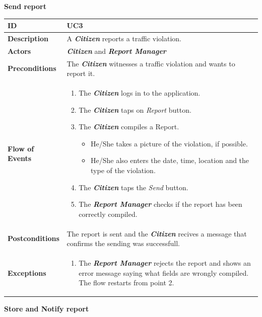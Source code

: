 \documentclass{report}
\begin{document}
\begin{center}
	\textbf{Send report}
\end{center}

\begin{tabularx}{\linewidth}{| l | X |}
	\hline
	\textbf{ID} & UC3\\
	
	\hline
	\textbf{Description} & A \textbf{\textit{Citizen}} reports a traffic violation.\\
	
	\hline
	\textbf{Actors} & \textbf{\textit{Citizen}} and \textbf{\textit{Report Manager}}\\
	
	\hline
	\textbf{Preconditions} & The \textbf{\textit{Citizen}} witnesses a traffic violation and wants to report it.\\
	
	\hline
	\textbf{Flow of Events} & \parbox{0.7\textwidth}{\begin{enumerate}
			\item The \textbf{\textit{Citizen}} logs in to the application.
			\item The \textbf{\textit{Citizen}} taps on \textit{Report} button.
			\item The \textbf{\textit{Citizen}} compiles a Report.
			\begin{itemize}
				\item He/She takes a picture of the violation, if possible.
				\item He/She also enters the date, time, location and the type of the violation.			
			\end{itemize}
			\item The \textbf{\textit{Citizen}} taps the \textit{Send} button.
			\item The \textbf{\textit{Report Manager}} checks if the report has been correctly compiled.		
	\end{enumerate}}\\
	
	\hline
	\textbf{Postconditions} & The report is sent and the \textbf{\textit{Citizen}} recives a message that confirms the sending was successfull.\\
	
	\hline
	\textbf{Exceptions} & \parbox{0.7\textwidth}{ \begin{enumerate}
			\item The \textbf{\textit{Report Manager}} rejects the report and shows an error message saying what fields are wrongly compiled. The flow restarts from point 2. 
		\end{enumerate}}\\
	
	\hline
	
\end{tabularx}
\begin{center}
	\textbf{Store and Notify report}
\end{center}
\end{document}
